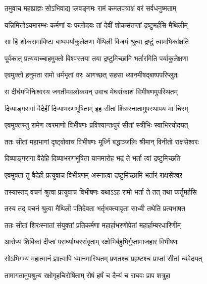 
\twolineshloka
{तमुवाच महाप्राज्ञः सोऽभिवाद्य प्लवङ्गमः}
{रामं कमलपत्राक्षं वरं सर्वधनुष्मताम्} %

\twolineshloka
{यन्निमित्तोऽयमारम्भः कर्मणां यः फलोदयः}
{तां देवीं शोकसंतप्तां द्रष्टुमर्हसि मैथिलीम्} %

\twolineshloka
{सा हि शोकसमाविष्टा बाष्पपर्याकुलेक्षणा}
{मैथिली विजयं श्रुत्वा द्रष्टुं त्वामभिकांक्षति} %

\twolineshloka
{पूर्वकात् प्रत्ययाच्चाहमुक्तो विश्वस्तया तया}
{द्रष्टुमिच्छामि भर्तारमिति पर्याकुलेक्षणा} %

\twolineshloka
{एवमुक्तो हनुमता रामो धर्मभृतां वरः}
{आगच्छत् सहसा ध्यानमीषद्बाष्पपरिप्लुतः} %

\twolineshloka
{स दीर्घमभिनिःश्वस्य जगतीमवलोकयन्}
{उवाच मेघसंकाशं विभीषणमुपस्थितम्} %

\twolineshloka
{दिव्याङ्गरागां वैदेहीं दिव्याभरणभूषिताम्}
{इह सीतां शिरःस्नातामुपस्थापय मा चिरम्} %

\twolineshloka
{एवमुक्तस्तु रामेण त्वरमाणो विभीषणः}
{प्रविश्यान्तःपुरं सीतां स्त्रीभिः स्वाभिरचोदयत्} %

\twolineshloka
{ततः सीतां महाभागां दृष्ट्वोवाच विभीषणः}
{मूर्ध्नि बद्धाञ्जलिः श्रीमान् विनीतो राक्षसेश्वरः} %

\twolineshloka
{दिव्याङ्गरागा वैदेहि दिव्याभरणभूषिता}
{यानमारोह भद्रं ते भर्ता त्वां द्रष्टुमिच्छति} %

\twolineshloka
{एवमुक्ता तु वैदेही प्रत्युवाच विभीषणम्}
{अस्नात्वा द्रष्टुमिच्छामि भर्तारं राक्षसेश्वर} %

\twolineshloka
{तस्यास्तद् वचनं श्रुत्वा प्रत्युवाच विभीषणः}
{यथाऽऽह रामो भर्ता ते तत् तथा कर्तुमर्हसि} %

\twolineshloka
{तस्य तद् वचनं श्रुत्वा मैथिली पतिदेवता}
{भर्तृभक्त्यावृता साध्वी तथेति प्रत्यभाषत} %

\twolineshloka
{ततः सीतां शिरःस्नातां संयुक्तां प्रतिकर्मणा}
{महार्हाभरणोपेतां महार्हाम्बरधारिणीम्} %

\twolineshloka
{आरोप्य शिबिकां दीप्तां परार्घ्याम्बरसंवृताम्}
{रक्षोभिर्बहुभिर्गुप्तामाजहार विभीषणः} %

\twolineshloka
{सोऽभिगम्य महात्मानं ज्ञात्वापि ध्यानमास्थितम्}
{प्रणतश्च प्रहृष्टश्च प्राप्तां सीतां न्यवेदयत्} %

\twolineshloka
{तामागतामुपश्रुत्य रक्षोगृहचिरोषिताम्}
{रोषं हर्षं च दैन्यं च राघवः प्राप शत्रुहा} %

